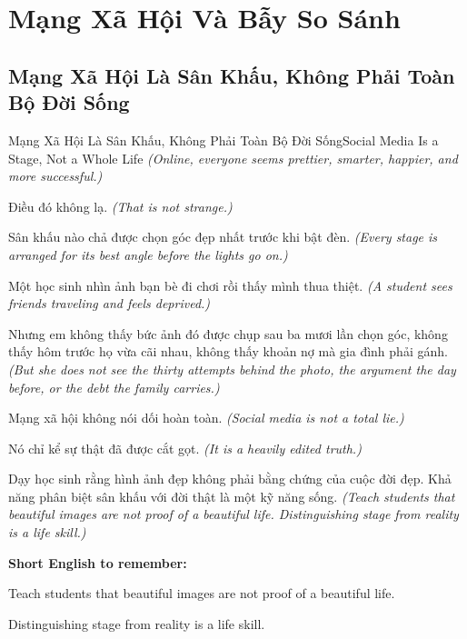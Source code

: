 \chapter{Mạng Xã Hội Và Bẫy So Sánh}

\section{Mạng Xã Hội Là Sân Khấu, Không Phải Toàn Bộ Đời Sống}
\begin{truyen}{Mạng Xã Hội Là Sân Khấu, Không Phải Toàn Bộ Đời Sống}{Social Media Is a Stage, Not a Whole Life}
\textit{(Online, everyone seems prettier, smarter, happier, and more successful.)}

Điều đó không lạ.
\textit{(That is not strange.)}

Sân khấu nào chả được chọn góc đẹp nhất trước khi bật đèn.
\textit{(Every stage is arranged for its best angle before the lights go on.)}

Một học sinh nhìn ảnh bạn bè đi chơi rồi thấy mình thua thiệt.
\textit{(A student sees friends traveling and feels deprived.)}

Nhưng em không thấy bức ảnh đó được chụp sau ba mươi lần chọn góc, không thấy hôm trước họ vừa cãi nhau, không thấy khoản nợ mà gia đình phải gánh.
\textit{(But she does not see the thirty attempts behind the photo, the argument the day before, or the debt the family carries.)}

Mạng xã hội không nói dối hoàn toàn.
\textit{(Social media is not a total lie.)}

Nó chỉ kể sự thật đã được cắt gọt.
\textit{(It is a heavily edited truth.)}

\end{truyen}

\begin{baihoc}
Dạy học sinh rằng hình ảnh đẹp không phải bằng chứng của cuộc đời đẹp. Khả năng phân biệt sân khấu với đời thật là một kỹ năng sống.
\textit{(Teach students that beautiful images are not proof of a beautiful life. Distinguishing stage from reality is a life skill.)}
\end{baihoc}

\begin{ghinhoanh}
\textbf{Short English to remember:}

Teach students that beautiful images are not proof of a beautiful life.

Distinguishing stage from reality is a life skill.

\end{ghinhoanh}

